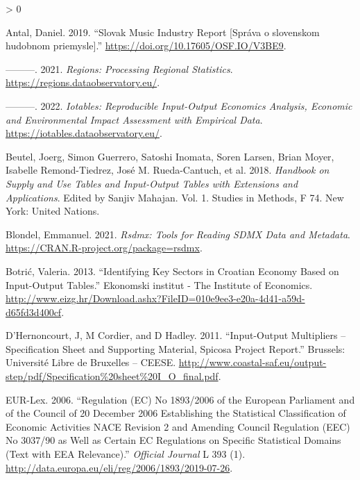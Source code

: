 \documentclass[
]{article}
\newlength{\cslhangindent}
\newenvironment{CSLReferences}[2] %
 {%
  \setlength{\parindent}{0pt}
  \ifodd #1 \everypar{\setlength{\hangindent}{\cslhangindent}}\ignorespaces\fi
  \ifnum #2 > 0
  \setlength{\parskip}{#2\baselineskip}
  \fi
 }%
 {}
\begin{document}
\hypertarget{refs}{}
\begin{CSLReferences}{1}{0}
\leavevmode\hypertarget{ref-antal_slovenskom_hudobnom_2019_en}{}%
Antal, Daniel. 2019. {``{Slovak Music Industry Report} {[}{Správa} {o
slovenskom hudobnom priemysle}{]}.''}
\url{https://doi.org/10.17605/OSF.IO/V3BE9}.

\leavevmode\hypertarget{ref-R-regions}{}%
---------. 2021. \emph{Regions: Processing Regional Statistics}.
\url{https://regions.dataobservatory.eu/}.

\leavevmode\hypertarget{ref-R-iotables}{}%
---------. 2022. \emph{Iotables: Reproducible Input-Output Economics
Analysis, Economic and Environmental Impact Assessment with Empirical
Data}. \url{https://iotables.dataobservatory.eu/}.

\leavevmode\hypertarget{ref-un_iot_handbook_2018}{}%
Beutel, Joerg, Simon Guerrero, Satoshi Inomata, Soren Larsen, Brian
Moyer, Isabelle Remond-Tiedrez, José M. Rueda-Cantuch, et al. 2018.
\emph{Handbook on Supply and Use Tables and Input-Output Tables with
Extensions and Applications}. Edited by Sanjiv Mahajan. Vol. 1. Studies
in Methods, F 74. New York: United Nations.

\leavevmode\hypertarget{ref-R-rsdmx}{}%
Blondel, Emmanuel. 2021. \emph{Rsdmx: Tools for Reading SDMX Data and
Metadata}. \url{https://CRAN.R-project.org/package=rsdmx}.

\leavevmode\hypertarget{ref-botric_identifying_2013}{}%
Botrić, Valeria. 2013. {``Identifying Key Sectors in Croatian Economy
Based on Input-Output Tables.''} Ekonomski institut - The Institute of
Economics.
\url{http://www.eizg.hr/Download.ashx?FileID=010e9ee3-e20a-4d41-a59d-d65fd3d400cf}.

\leavevmode\hypertarget{ref-dhernoncourt_io_2011}{}%
D'Hernoncourt, J, M Cordier, and D Hadley. 2011. {``Input-Output
Multipliers -- Specification Sheet and Supporting Material, Spicosa
Project Report.''} Brussels: Université Libre de Bruxelles -- {CEESE}.
\url{http://www.coastal-saf.eu/output-step/pdf/Specification\%20sheet\%20I_O_final.pdf}.

\leavevmode\hypertarget{ref-02006R1893}{}%
EUR-Lex. 2006. {``Regulation ({EC}) No 1893/2006 of the European
Parliament and of the Council of 20 December 2006 Establishing the
Statistical Classification of Economic Activities {NACE} Revision 2 and
Amending Council Regulation ({EEC}) No 3037/90 as Well as Certain {EC}
Regulations on Specific Statistical Domains (Text with {EEA}
Relevance).''} \emph{Official Journal} L 393 (1).
\url{http://data.europa.eu/eli/reg/2006/1893/2019-07-26}.


\end{CSLReferences}
\end{document}
